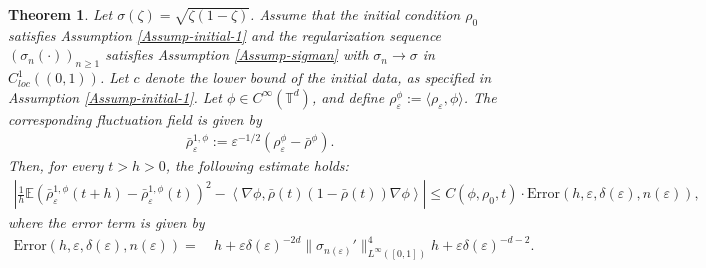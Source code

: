 \documentclass[UTF-8,reqno]{amsart}
\numberwithin{equation}{section}
\newtheorem{theorem}{Theorem}[section]
\def\geq{\geqslant}
\def\leq{\leqslant}
\def\geq{\geqslant}
\def\leq{\leqslant}
\begin{document}
\begin{theorem}
Let $\sigma(\zeta)=\sqrt{\zeta(1-\zeta)}$. Assume that the initial condition $\rho_0$ satisfies Assumption \ref{Assump-initial-1} and the regularization sequence $(\sigma_n(\cdot))_{n \geq 1}$ satisfies Assumption \ref{Assump-sigman} with $\sigma_n\rightarrow\sigma$ in $C^1_{loc}((0,1))$. Let $c$ denote the lower bound of the initial data, as specified in Assumption \ref{Assump-initial-1}. Let $\phi \in C^{\infty}(\mathbb{T}^d)$, and define $\rho_{\varepsilon}^{\phi} := \langle \rho_{\varepsilon}, \phi \rangle$. The corresponding fluctuation field is given by
\begin{align*}
\bar{\rho}_{\varepsilon}^{1,\phi} := \varepsilon^{-1/2}(\rho_{\varepsilon}^{\phi} - \bar{\rho}^{\phi}).
\end{align*}
Then, for every $t > h > 0$, the following estimate holds:
\begin{align*}
\left| \frac{1}{h} \mathbb{E} \left( \bar{\rho}_{\varepsilon}^{1,\phi}(t+h) - \bar{\rho}_{\varepsilon}^{1,\phi}(t) \right)^2 
- \left\langle \nabla \phi, \bar{\rho}(t)(1 - \bar{\rho}(t)) \nabla \phi \right\rangle \right|
\leq C(\phi, \rho_0, t) \cdot \mathrm{Error}(h, \varepsilon, \delta(\varepsilon), n(\varepsilon)),
\end{align*}
where the error term is given by
\begin{align*}
\mathrm{Error}(h, \varepsilon, \delta(\varepsilon), n(\varepsilon)) =\ & h 
+ \varepsilon \delta(\varepsilon)^{-2d} \|\sigma_{n(\varepsilon)}'\|_{L^{\infty}([0,1])}^4 h + \varepsilon \delta(\varepsilon)^{-d-2}. 
\end{align*}
\end{theorem}
\end{document}
